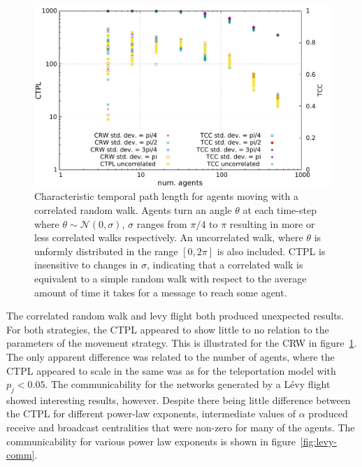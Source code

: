 \documentclass[conference]{IEEEtran}
\begin{document}
\begin{figure}
  \includegraphics[width=\columnwidth]{correlated-scaling.pdf}
  \caption{Characteristic temporal path length for agents moving with
    a correlated random walk. Agents turn an angle $\theta$ at each
    time-step where $\theta \sim \mathcal{N}(0,\sigma)$, $\sigma$
    ranges from $\pi/4$ to $\pi$ resulting in more or less correlated
    walks respectively. An uncorrelated walk, where $\theta$ is
    unformly distributed in the range $[0, 2\pi]$ is also
    included. CTPL is insensitive to changes in $\sigma$, indicating
    that a correlated walk is equivalent to a simple random walk with
    respect to the average amount of time it takes for a message to
    reach some agent.}
  \label{fig:crw-scale}
\end{figure}

The correlated random walk and levy flight both produced unexpected
results. For both strategies, the CTPL appeared to show little to no
relation to the parameters of the movement strategy. This is
illustrated for the CRW in figure~\ref{fig:crw-scale}. The only
apparent difference was related to the number of agents, where the
CTPL appeared to scale in the same was as for the teleportation model
with $p_j < 0.05$. The communicability for the networks generated by a
L\'evy flight showed interesting results, however. Despite there being
little difference between the CTPL for different power-law exponents,
intermediate values of $\alpha$ produced receive and broadcast
centralities that were non-zero for many of the agents. The
communicability for various power law exponents is shown in
figure~\ref{fig:levy-comm}.
\end{document}
